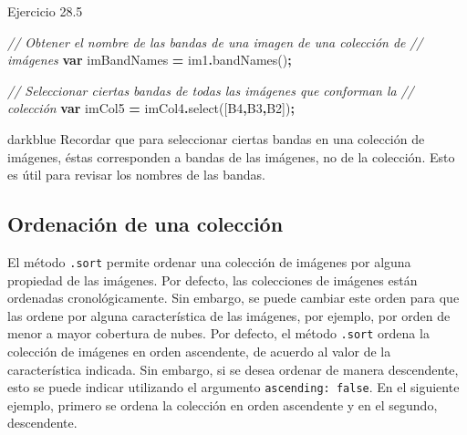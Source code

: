 \documentclass[
  12pt,
  letterpaper,
  twoside]{book}
\newenvironment{Shaded}{\begin{snugshade}}{\end{snugshade}}
\newcommand{\CommentTok}[1]{\textcolor[rgb]{0.56,0.35,0.01}{\textit{#1}}}
\newcommand{\FunctionTok}[1]{\textcolor[rgb]{0.00,0.00,0.00}{#1}}
\newcommand{\KeywordTok}[1]{\textcolor[rgb]{0.13,0.29,0.53}{\textbf{#1}}}
\newcommand{\NormalTok}[1]{#1}
\newcommand{\OperatorTok}[1]{\textcolor[rgb]{0.81,0.36,0.00}{\textbf{#1}}}
\newcommand{\StringTok}[1]{\textcolor[rgb]{0.31,0.60,0.02}{#1}}
\begin{document}
Ejercicio 28.5

\begin{Shaded}
\begin{Highlighting}[]
\CommentTok{// Obtener el nombre de las bandas de una imagen de una colección de }
\CommentTok{// imágenes}
\KeywordTok{var}\NormalTok{ imBandNames }\OperatorTok{=}\NormalTok{ im1}\OperatorTok{.}\FunctionTok{bandNames}\NormalTok{()}\OperatorTok{;}

\CommentTok{// Seleccionar ciertas bandas de todas las imágenes que conforman la }
\CommentTok{// colección}
\KeywordTok{var}\NormalTok{ imCol5 }\OperatorTok{=}\NormalTok{ imCol4}\OperatorTok{.}\FunctionTok{select}\NormalTok{([}\StringTok{\textquotesingle{}B4\textquotesingle{}}\OperatorTok{,}\StringTok{\textquotesingle{}B3\textquotesingle{}}\OperatorTok{,}\StringTok{\textquotesingle{}B2\textquotesingle{}}\NormalTok{])}\OperatorTok{;}
\end{Highlighting}
\end{Shaded}

\begin{bluebox2}

\begin{awesomeblock}{5pt}{\faLightbulb}{darkblue}
Recordar que para seleccionar ciertas bandas en una colección de imágenes, éstas corresponden a bandas de las imágenes, no de la colección. Esto es útil para revisar los nombres de las bandas.

\end{awesomeblock}

\end{bluebox2}

\hypertarget{ordenaciuxf3n-de-una-colecciuxf3n}{%
\subsection*{Ordenación de una colección}\label{ordenaciuxf3n-de-una-colecciuxf3n}}

El método \texttt{.sort} permite ordenar una colección de imágenes por alguna propiedad de las imágenes. Por defecto, las colecciones de imágenes están ordenadas cronológicamente. Sin embargo, se puede cambiar este orden para que las ordene por alguna característica de las imágenes, por ejemplo, por orden de menor a mayor cobertura de nubes. Por defecto, el método \texttt{.sort} ordena la colección de imágenes en orden ascendente, de acuerdo al valor de la característica indicada. Sin embargo, si se desea ordenar de manera descendente, esto se puede indicar utilizando el argumento \texttt{ascending:\ false}. En el siguiente ejemplo, primero se ordena la colección en orden ascendente y en el segundo, descendente.
\end{document}
